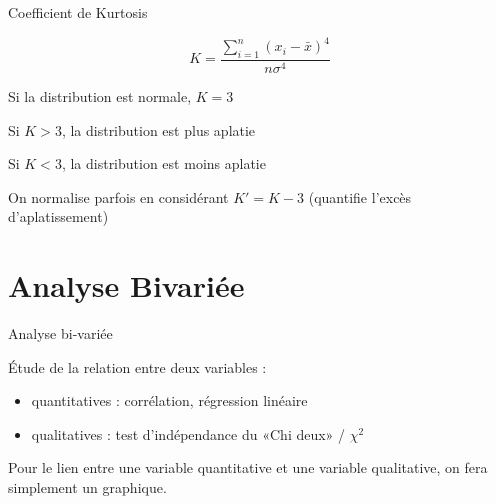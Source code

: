 \documentclass{beamer}
\begin{document}
\begin{frame}{Coefficient de Kurtosis}




$$ K=\frac{\sum_{i=1}^{n}(x_i -\bar{x})^4}{n\sigma^4}$$

Si la distribution est normale, $K= 3$

Si $K>3$, la distribution est \alert{plus aplatie} 

Si $K<3$, la distribution est \alert{moins aplatie} 

On normalise parfois en considérant $K'=K-3$ (quantifie l'excès d'aplatissement)


\end{frame}


\section{Analyse Bivariée}

\begin{frame}{Analyse bi-variée}


Étude de  la relation entre \alert{deux} variables : 

\begin{itemize}
  \item quantitatives : \alert{corrélation, régression linéaire}
  \item qualitatives : test d'indépendance du \alert{«Chi deux» / $\chi^2$}
\end{itemize}

\vspace{2cm}

\begin{scriptsize}
\begin{spacing}{0.75}
Pour le lien entre une variable quantitative et une variable qualitative, on fera simplement un graphique.
\end{spacing}
\end{scriptsize}


\end{frame}
\end{document}
